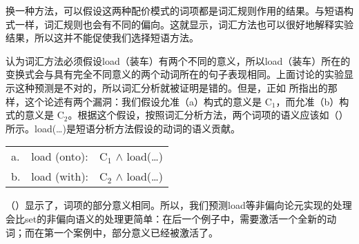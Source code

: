 \begin{exe}
\begin{xlist}[iv.]
\begin{exe}
\begin{xlist}[iv.]
换一种方法，可以假设这两种配价模式的词项都是词汇规则作用的结果。与短语构式一样，词汇规则也会有不同的偏向。这就显示，词汇方法也可以很好地解释实验结果，所以这并不能促使我们选择短语方法。

 \citet[]{Goldberg95a}认为词汇方法必须假设load（装车）有两个不同的意义，所以load（装车）所在的变换式会与具有完全不同意义的两个动词所在的句子表现相同。上面讨论的实验显示这种预测是不对的，所以词汇分析就被证明是错的。但是，正如 所指出的那样，这个论述有两个漏洞：我们假设允准（a）构式的意义是 C$_1$，而允准（b）构式的意义是 C$_2$。根据这个假设，按照词汇分析方法，两个词项的语义应该如（）所示。load(\ldots)是短语分析方法假设的动词的语义贡献。
\ea
\begin{tabular}[t]{@{}l@{~}l@{~}l@{}}
a. & load (onto): & C$_1$ $\wedge$ load(\ldots)\\
b. & load (with): & C$_2$ $\wedge$ load(\ldots)\\
\end{tabular}
\z
（）显示了，词项的部分意义相同。所以，我们预测load等非偏向论元实现的处理会比set的非偏向语义的处理更简单：在后一个例子中，需要激活一个全新的动词；而在第一个案例中，部分意义已经被激活了。


\end{xlist}
\end{exe}
\end{xlist}
\end{exe}
